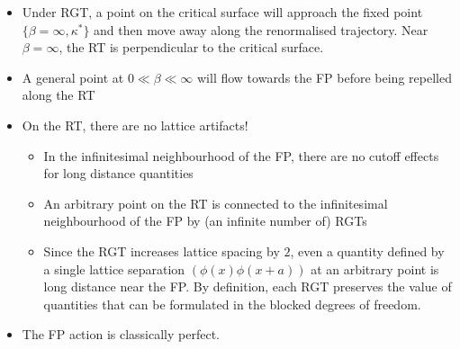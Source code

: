 \begin{itemize}
    \item Under RGT, a point on the critical surface will approach the fixed point $\{\beta = \infty, \kappa^*\}$ and then move away along the renormalised trajectory. Near $\beta = \infty$, the RT is perpendicular to the critical surface.
    \item A general point at $0 \ll \beta \ll \infty$ will flow towards the FP before being repelled along the RT
    \item On the RT, there are no lattice artifacts!
    \begin{itemize}
        \item In the infinitesimal neighbourhood of the FP, there are no cutoff effects for long distance quantities
        \item An arbitrary point on the RT is connected to the infinitesimal neighbourhood of the FP by (an infinite number of) RGTs
        \item Since the RGT increases lattice spacing by $2$, even a quantity defined by a single lattice separation $(\phi(x)\phi(x+a))$ at an arbitrary point is long distance near the FP. By definition, each RGT preserves the value of quantities that can be formulated in the blocked degrees of freedom.
    \end{itemize}
    \item The FP action is classically perfect.
\end{itemize}

